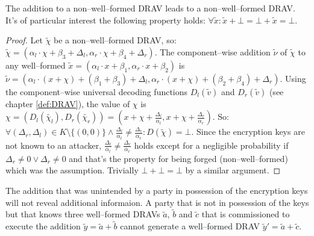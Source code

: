 \begin{lem}
  \label{lem:DRAV-add-bad}

The addition to a non--well--formed DRAV leads to a non--well--formed DRAV. It's
of particular interest the following property holds: $\forall \widetilde{x}:
\widetilde{x} + \bot = \bot + \widetilde{x} = \bot$.

\end{lem}
\begin{proof}

Let $\widetilde{\chi}$ be a non--well--formed DRAV, so: $\widetilde{\chi} =
(\alpha_l \cdot \chi + \beta_3 + \Delta_l, \alpha_r \cdot \chi + \beta_4 +
\Delta_r)$. The component--wise addition $\widetilde{\nu}$ of $\widetilde{\chi}$
to any well--formed $\widetilde{x} = (\alpha_l \cdot x + \beta_1, \alpha_r \cdot
x + \beta_2)$ is $\widetilde{\nu} = (\alpha_l \cdot (x+\chi) + (\beta_1+\beta_3)
+ \Delta_l, \alpha_r \cdot (x+\chi) + (\beta_2+\beta_4) + \Delta_r)$.  Using the
component--wise universal decoding functions $D_l(\widetilde{v})$ and
$D_r(\widetilde{v})$ (see chapter \ref{def:DRAV}), the value of $\chi$ is $\chi
= (D_l(\widetilde{\chi_l}), D_r(\widetilde{\chi_r})) = (x + \chi +
\frac{\Delta_l}{\alpha_l}, x + \chi + \frac{\Delta_r}{\alpha_r})$. So: $\forall
(\Delta_r, \Delta_l) \in K \setminus \{(0, 0)\} \wedge \frac{\Delta_l}{\alpha_l}
\neq \frac{\Delta_r}{\alpha_r}: D(\widetilde{\chi}) = \bot$. Since the
encryption keys are not known to an attacker, $\frac{\Delta_l}{\alpha_l} \neq
\frac{\Delta_r}{\alpha_r}$ holds except for a negligible probability if
$\Delta_r \neq 0 \vee \Delta_r \neq 0$ and that's the property for being forged
(non--well--formed) which was the assumption. Trivially $\bot + \bot = \bot$ by
a similar argument.

\end{proof}


\begin{lem}
  \label{lem:wrong-add}

  The addition that was unintended by a party in possession of the encryption
  keys will not reveal additional informaion. A party that is not in possession
  of the keys but that knows three well--formed DRAVs $\widetilde{a}$,
  $\widetilde{b}$ and $\widetilde{c}$ that is commissioned to execute the
  addition $\widetilde{y} = \widetilde{a} + \widetilde{b}$ cannot generate a
  well--formed DRAV $\widetilde{y}' = \widetilde{a} + \widetilde{c}$.

\end{lem}


